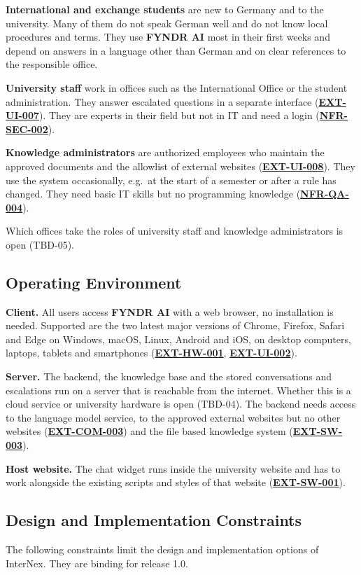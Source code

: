\documentclass[11pt, a4paper]{article}
\newcommand{\reqref}[1]{\hyperref[req:#1]{\textbf{#1}}}
\begin{document}
\textbf{International and exchange students} are new to Germany and to the university. Many of them do not speak German well and do not know local procedures and terms. They use \textbf{FYNDR AI} most in their first weeks and depend on answers in a language other than German and on clear references to the responsible office.

\textbf{University staff} work in offices such as the International Office or the student administration. They answer escalated questions in a separate interface (\reqref{EXT-UI-007}). They are experts in their field but not in IT and need a login (\reqref{NFR-SEC-002}).

\textbf{Knowledge administrators} are authorized employees who maintain the approved documents and the allowlist of external websites (\reqref{EXT-UI-008}). They use the system occasionally, e.g.\ at the start of a semester or after a rule has changed. They need basic IT skills but no programming knowledge (\reqref{NFR-QA-004}).

Which offices take the roles of university staff and knowledge administrators is open (TBD-05).

\subsection{Operating Environment}
\textbf{Client.} All users access \textbf{FYNDR AI} with a web browser, no installation is needed. Supported are the two latest major versions of Chrome, Firefox, Safari and Edge on Windows, macOS, Linux, Android and iOS, on desktop computers, laptops, tablets and smartphones (\reqref{EXT-HW-001}, \reqref{EXT-UI-002}).

\textbf{Server.} The backend, the knowledge base and the stored conversations and escalations run on a server that is reachable from the internet. Whether this is a cloud service or university hardware is open (TBD-04). The backend needs access to the language model service, to the approved external websites but no other websites (\reqref{EXT-COM-003}) and the file based knowledge system (\reqref{EXT-SW-003}).

\textbf{Host website.} The chat widget runs inside the university website and has to work alongside the existing scripts and styles of that website (\reqref{EXT-SW-001}).

\subsection{Design and Implementation Constraints}
The following constraints limit the design and implementation options of InterNex. They are binding for release 1.0.
\end{document}
